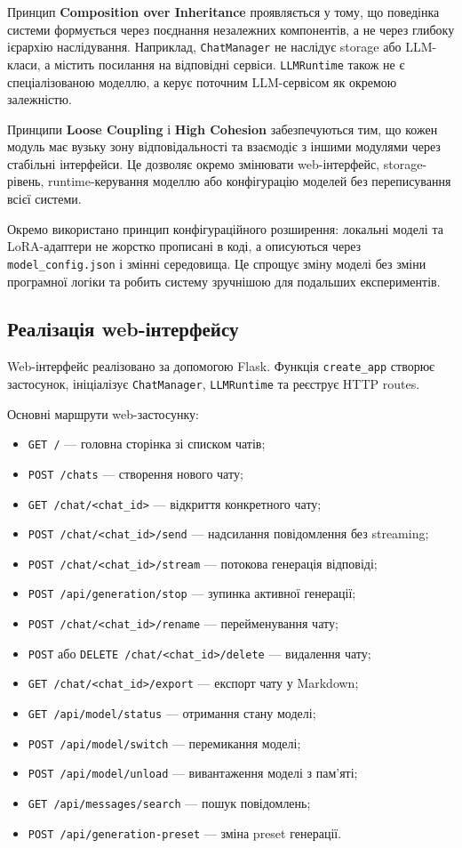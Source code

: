 Принцип \textbf{Composition over Inheritance} проявляється у тому, що поведінка системи формується через поєднання незалежних компонентів, а не через глибоку ієрархію наслідування. Наприклад, \texttt{ChatManager} не наслідує storage або LLM-класи, а містить посилання на відповідні сервіси. \texttt{LLMRuntime} також не є спеціалізованою моделлю, а керує поточним LLM-сервісом як окремою залежністю.

Принципи \textbf{Loose Coupling} і \textbf{High Cohesion} забезпечуються тим, що кожен модуль має вузьку зону відповідальності та взаємодіє з іншими модулями через стабільні інтерфейси. Це дозволяє окремо змінювати web-інтерфейс, storage-рівень, runtime-керування моделлю або конфігурацію моделей без переписування всієї системи.

Окремо використано принцип конфігураційного розширення: локальні моделі та LoRA-адаптери не жорстко прописані в коді, а описуються через \texttt{model\_config.json} і змінні середовища. Це спрощує зміну моделі без зміни програмної логіки та робить систему зручнішою для подальших експериментів.

\subsection{Реалізація web-інтерфейсу}

Web-інтерфейс реалізовано за допомогою Flask. Функція \texttt{create\_app} створює застосунок, ініціалізує \texttt{ChatManager}, \texttt{LLMRuntime} та реєструє HTTP routes.

Основні маршрути web-застосунку:
\begin{itemize}
  \item \texttt{GET /} --- головна сторінка зі списком чатів;
  \item \texttt{POST /chats} --- створення нового чату;
  \item \texttt{GET /chat/<chat\_id>} --- відкриття конкретного чату;
  \item \texttt{POST /chat/<chat\_id>/send} --- надсилання повідомлення без streaming;
  \item \texttt{POST /chat/<chat\_id>/stream} --- потокова генерація відповіді;
  \item \texttt{POST /api/generation/stop} --- зупинка активної генерації;
  \item \texttt{POST /chat/<chat\_id>/rename} --- перейменування чату;
  \item \texttt{POST} або \texttt{DELETE /chat/<chat\_id>/delete} --- видалення чату;
  \item \texttt{GET /chat/<chat\_id>/export} --- експорт чату у Markdown;
  \item \texttt{GET /api/model/status} --- отримання стану моделі;
  \item \texttt{POST /api/model/switch} --- перемикання моделі;
  \item \texttt{POST /api/model/unload} --- вивантаження моделі з пам'яті;
  \item \texttt{GET /api/messages/search} --- пошук повідомлень;
  \item \texttt{POST /api/generation-preset} --- зміна preset генерації.
\end{itemize}

